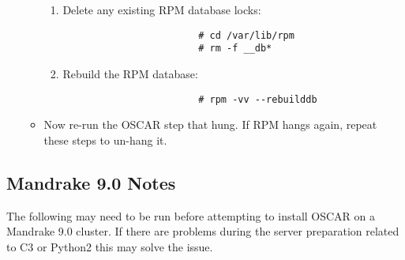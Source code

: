 \begin{itemize}
\begin{itemize}
\begin{enumerate}
				\item Delete any existing RPM database locks:
					\begin{verbatim}
						# cd /var/lib/rpm
						# rm -f __db*
					\end{verbatim}

				\item Rebuild the RPM database:
					\begin{verbatim}
						# rpm -vv --rebuilddb
					\end{verbatim}
			\end{enumerate}

		\item Now re-run the OSCAR step that hung.  If RPM hangs again,
		repeat these steps to un-hang it.
	\end{itemize}

\end{itemize}




\subsection{Mandrake 9.0 Notes}
\label{subsec:mdk90notes}

The following may need to be run before attempting to install OSCAR on a
Mandrake 9.0 cluster.  If there are problems during the server preparation
related to C3 or Python2 this may solve the issue.

